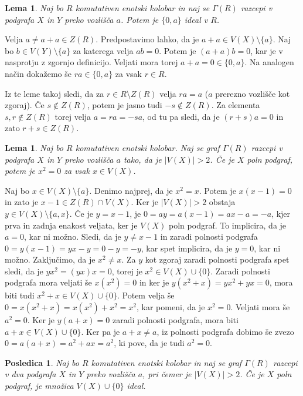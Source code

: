 \documentclass[a4paper, 12pt]{amsart}
\theoremstyle{definition} %
\theoremstyle{plain} %
\newtheorem{lema}[definicija]{Lema}
\newtheorem{posledica}[definicija]{Posledica}
\begin{document}
\begin{lema}
Naj bo $R$ komutativen enotski kolobar in naj se $\Gamma(R)$ razcepi v podgrafa $X$ in $Y$ preko vozlišča $a$. Potem je $\{0,a\}$ ideal v $R$.
\end{lema}

\proof
Velja $a \neq a+ a \in Z(R)$. Predpostavimo lahko, da je $a+a \in V(X) \setminus \{a\}$. Naj bo $b\in V(Y) \setminus \{a\}$ za katerega velja $ab = 0$. Potem je $(a+a)b = 0$, kar je v nasprotju z zgornjo definicijo. Veljati mora torej $a+a = 0 \in \{0,a\}$. Na analogen način dokažemo še $ra \in \{0,a\}$ za vsak $r\in R$.
\endproof

Iz te leme takoj sledi, da za $r\in R\setminus Z(R)$ velja $ra = a$ ($a$ prerezno vozlišče kot zgoraj). Če $s\notin Z(R)$, potem je jasno tudi $-s \notin Z(R)$. Za elementa $s,r\notin Z(R)$ torej velja $a=ra=-sa$, od tu pa sledi, da je $(r+s)a = 0$ in zato $r+s \in Z(R)$.

\begin{lema}
Naj bo $R$ komutativen enotski kolobar. Naj se graf $\Gamma(R)$ razcepi v podgrafa $X$ in $Y$ preko vozlišča $a$ tako, da je $|V(X)|>2$. Če je $X$ poln podgraf, potem je $x^2 = 0$ za vsak $x\in V(X)$.
\end{lema}

\proof
Naj bo $x\in V(X)\setminus \{a\}$. Denimo najprej, da je $x^2 = x$. Potem je $x(x-1) = 0$ in zato je $x-1\in Z(R) \cap V(X)$. Ker je $|V(X)|> 2$ obstaja $y\in V(X)\setminus \{a,x\}$. Če je $y = x-1$, je $0 = ay = a(x-1) = ax - a = -a$, kjer prva in zadnja enakost veljata, ker je $V(X)$ poln podgraf. To implicira, da je $a=0$, kar ni možno. Sledi, da je $y\neq x-1$ in zaradi polnosti podgrafa $0 = y(x-1) = yx-y = 0-y = -y$, kar spet implicira, da je $y=0$, kar ni možno. Zaključimo, da je $x^2 \neq x$. Za $y$ kot zgoraj zaradi polnosti podgrafa spet sledi, da je $yx^2 = (yx)x = 0$, torej je $x^2 \in V(X)\cup\{0\}$. Zaradi polnosti podgrafa mora veljati še $x(x^2)=0$ in ker je $y(x^2 + x ) = yx^2 + yx =0 $, mora biti tudi $x^2 + x\in V(X) \cup \{0\}$. Potem velja še  $0 = x(x^2 + x) = x(x^2) + x^2 = x^2$, kar pomeni, da je $x^2 = 0$. Veljati mora še $a^2 = 0$. Ker je $y(a+x) = 0 $ zaradi polnosti podgrafa, mora biti $a+x\in V(X) \cup\{0\}$. Ker pa je $a+x \neq a$, iz polnosti podgrafa dobimo še zvezo $0 = a(a+x) = a^2 + ax = a^2$, ki pove, da je tudi $a^2 = 0$.
\endproof

\begin{posledica}
Naj bo $R$ komutativen enotski kolobar in naj se graf $\Gamma(R)$ razcepi v dva podgrafa $X$ in $Y$ preko vozlišča $a$, pri čemer je $|V(X)|>2$. Če je $X$ poln podgraf, je množica $V(X)\cup \{0\}$ ideal.
\end{posledica}
\end{document}
